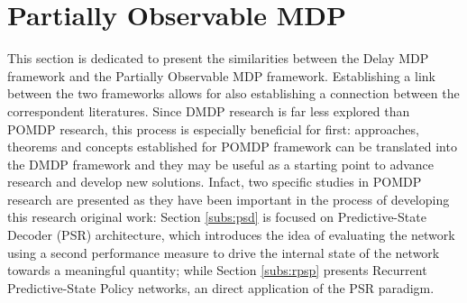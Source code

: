                     
        
    \newpage
    \section{Partially Observable MDP}
        \label{sota:pomdp}
        
        This section is dedicated to present the similarities between the Delay MDP framework and the Partially Observable MDP framework. Establishing a link between the two frameworks allows for also establishing a connection between the correspondent literatures. Since DMDP research is far less explored than POMDP research, this process is especially beneficial for first: approaches, theorems and concepts established for POMDP framework can be translated into the DMDP framework and they may be useful as a starting point to advance research and develop new solutions. Infact, two specific studies in POMDP research are presented as they have been important in the process of developing this research original work: Section \ref{subs:psd} is focused on Predictive-State Decoder (PSR) architecture, which introduces the idea of evaluating the network using a second performance measure to drive the internal state of the network towards a meaningful quantity; while Section \ref{subs:rpsp} presents Recurrent Predictive-State Policy networks, an direct application of the PSR paradigm.
        
